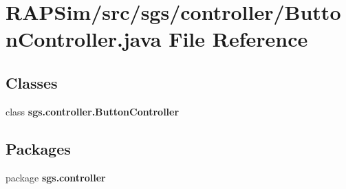 \section{R\-A\-P\-Sim/src/sgs/controller/\-Button\-Controller.java File Reference}
\label{_button_controller_8java}
\subsection*{Classes}
\begin{DoxyCompactItemize}
\item 
class {\bf sgs.\-controller.\-Button\-Controller}
\end{DoxyCompactItemize}
\subsection*{Packages}
\begin{DoxyCompactItemize}
\item 
package {\bf sgs.\-controller}
\end{DoxyCompactItemize}
